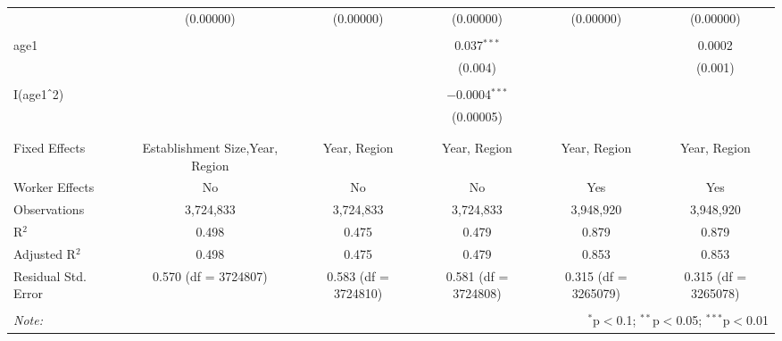 \begin{table}[!htbp]
\begin{tabular}{@{\extracolsep{5pt}}lccccc}
  & (0.00000) & (0.00000) & (0.00000) & (0.00000) & (0.00000) \\ 
  & & & & & \\ 
 age1 &  &  & 0.037$^{***}$ &  & 0.0002 \\ 
  &  &  & (0.004) &  & (0.001) \\ 
  & & & & & \\ 
 I(age1$\hat{\mkern6mu}$2) &  &  & $-$0.0004$^{***}$ &  &  \\ 
  &  &  & (0.00005) &  &  \\ 
  & & & & & \\ 
\hline \\[-1.8ex] 
Fixed Effects & Establishment Size,Year, Region & Year, Region & Year, Region & Year, Region & Year, Region \\ 
Worker Effects & No & No & No & Yes & Yes \\ 
Observations & 3,724,833 & 3,724,833 & 3,724,833 & 3,948,920 & 3,948,920 \\ 
R$^{2}$ & 0.498 & 0.475 & 0.479 & 0.879 & 0.879 \\ 
Adjusted R$^{2}$ & 0.498 & 0.475 & 0.479 & 0.853 & 0.853 \\ 
Residual Std. Error & 0.570 (df = 3724807) & 0.583 (df = 3724810) & 0.581 (df = 3724808) & 0.315 (df = 3265079) & 0.315 (df = 3265078) \\ 
\hline 
\hline \\[-1.8ex] 
\textit{Note:}  & \multicolumn{5}{r}{$^{*}$p$<$0.1; $^{**}$p$<$0.05; $^{***}$p$<$0.01} \\ 
\end{tabular} 
\end{table} 
